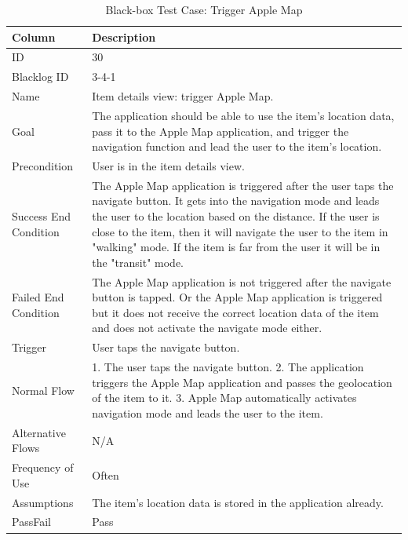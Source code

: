 \documentclass[12pt,a4paper]{article}
\begin{document}
          \begin{table}[H]
            \centering
              \begin{tabularx}{\textwidth}{l X}
                \hline
                Column & Description  \\ \hline
                ID & 30 \\
                Blacklog ID & 3-4-1 \\
                Name &  Item details view: trigger Apple Map. \\
                Goal &  The application should be able to use the item's location data, pass it to the Apple Map application, and trigger the navigation function and lead the user to the item's location.       \\
                Precondition & User is in the item details view.        \\
                Success End Condition & The Apple Map application is triggered after the user taps the navigate button. It gets into the navigation mode and leads the user to the location based on the distance. If the user is close to the item, then it will navigate the user to the item in "walking" mode. If the item is far from the user it will be in the "transit" mode.         \\
                Failed End Condition & The Apple Map application is not triggered after the navigate button is tapped. Or the Apple Map application is triggered but it does not receive the correct location data of the item and does not activate the navigate mode either.           \\
                Trigger & User taps the navigate button. \\
                Normal Flow & 1. The user taps the navigate button. 2. The application triggers the Apple Map application and passes the geolocation of the item to it. 3. Apple Map automatically activates navigation mode and leads the user to the item. \\
                Alternative Flows & N/A \\
                Frequency of Use & Often \\
                Assumptions & The item's location data is stored in the application already. \\
                Pass\/Fail & Pass \\
                \hline
              \end{tabularx}
              \caption[Table caption text]{Black-box Test Case: Trigger Apple Map}
              \label{table:Black-box Test Case: Trigger Apple Map}
          \end{table}
\end{document}
